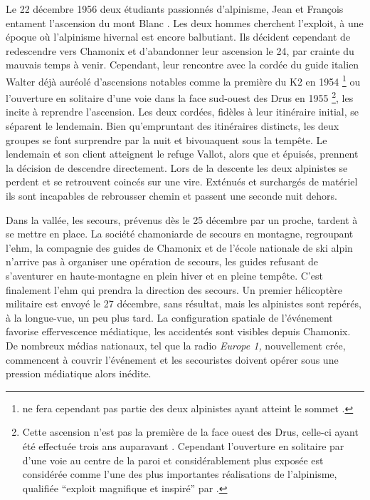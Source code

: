 Le 22 décembre 1956 deux étudiants passionnés d'alpinisme, Jean
 et François  entament l’ascension du mont
Blanc \autocite{Ballu1997}. Les deux hommes cherchent l'exploit, à une
époque où l'alpinisme hivernal est encore balbutiant. Ils décident
cependant de redescendre vers Chamonix et d'abandonner leur ascension
le 24, par crainte du mauvais temps à venir. Cependant, leur rencontre
avec la cordée du guide italien Walter  déjà auréolé
d'ascensions notables comme la première du K2 en 1954
\footnote{ ne fera cependant pas partie des deux
  alpinistes ayant atteint le sommet
  \autocite{ContributeursWikipedia2020a}.} ou l'ouverture en solitaire
d'une voie dans la face sud-ouest des Drus en 1955 \footnote{Cette
  ascension n'est pas la première de la face ouest des Drus, celle-ci
  ayant été effectuée trois ans auparavant
  \autocite{ContributeursWikipedia2020}. Cependant l'ouverture en
  solitaire par  d'une voie au centre de la paroi et
  considérablement plus exposée est considérée comme l'une des plus
  importantes réalisations de l'alpinisme, qualifiée
  \enquote{exploit magnifique et inspiré} par
  \textcite{Robbins2000}.}, les incite à reprendre l’ascension. Les
deux cordées, fidèles à leur itinéraire initial, se séparent le
lendemain. Bien qu'empruntant des itinéraires distincts, les deux
groupes se font surprendre par la nuit et bivouaquent sous la
tempête. Le lendemain  et son client atteignent le refuge
Vallot, alors que  et  épuisés, prennent la
décision de descendre directement. Lors de la descente les deux
alpinistes se perdent et se retrouvent coincés sur une
\gls{vire}. Exténués et surchargés de matériel ils sont incapables de
rebrousser chemin et passent une seconde nuit dehors.

Dans la vallée, les secours, prévenus dès le 25 décembre par un
proche, tardent à se mettre en place. La société chamoniarde de
secours en montagne, regroupant l'\ac{ehm}, la compagnie des guides de
Chamonix et de l'école nationale de ski alpin n'arrive pas à organiser
une opération de secours, les guides refusant de s'aventurer en
haute-montagne en plein hiver et en pleine tempête. C'est finalement
l'\ac{ehm} qui prendra la direction des secours. Un premier
hélicoptère militaire est envoyé le 27 décembre, sans résultat, mais
les alpinistes sont repérés, à la longue-vue, un peu plus tard. La
configuration spatiale de l'événement favorise effervescence
médiatique, les accidentés sont visibles depuis Chamonix. De nombreux
médias nationaux, tel que la radio \emph{Europe 1,} nouvellement crée,
commencent à couvrir l'événement et les secouristes doivent opérer
sous une pression médiatique alors inédite.

